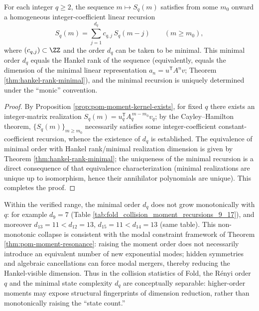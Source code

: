 \begin{proposition}\label{prop:pom-moment-minrecurrence-hankel}
For each integer \(q\ge 2\), the sequence \(m\mapsto S_q(m)\) satisfies from some \(m_0\) onward a homogeneous integer-coefficient linear recursion
\[
S_q(m)=\sum_{j=1}^{d_q} c_{q,j}\,S_q(m-j)\qquad(m\ge m_0),
\]
where \((c_{q,j})\subset\ZZ\) and the order \(d_q\) can be taken to be minimal.
This minimal order \(d_q\) equals the Hankel rank of the sequence (equivalently, equals the dimension of the minimal linear representation \(a_n=u^{\mathsf T}A^n v\); Theorem \ref{thm:hankel-rank-minimal}), and the minimal recursion is uniquely determined under the ``monic'' convention.
\end{proposition}
\begin{proof}
By Proposition \ref{prop:pom-moment-kernel-exists}, for fixed \(q\) there exists an integer-matrix realization \(S_q(m)=u_q^{\mathsf T}A_q^{\,m-m_0}v_q\);
by the Cayley--Hamilton theorem, \(\{S_q(m)\}_{m\ge m_0}\) necessarily satisfies some integer-coefficient constant-coefficient recursion, whence the existence of \(d_q\) is established.
The equivalence of minimal order with Hankel rank/minimal realization dimension is given by Theorem \ref{thm:hankel-rank-minimal}; the uniqueness of the minimal recursion is a direct consequence of that equivalence characterization (minimal realizations are unique up to isomorphism, hence their annihilator polynomials are unique). This completes the proof.
\end{proof}

\begin{remark}\label{rem:pom-moment-order-collapse-nonmonotone}
Within the verified range, the minimal order \(d_q\) does not grow monotonically with \(q\): for example \(d_9=7\) (Table \ref{tab:fold_collision_moment_recursions_9_17}), and moreover \(d_{13}=11<d_{12}=13\), \(d_{15}=11<d_{14}=13\) (same table).
This non-monotonic collapse is consistent with the modal constraint framework of Theorem \ref{thm:pom-moment-resonance}: raising the moment order does not necessarily introduce an equivalent number of new exponential modes; hidden symmetries and algebraic cancellations can force modal mergers, thereby reducing the Hankel-visible dimension.
Thus in the collision statistics of Fold, the Rényi order \(q\) and the minimal state complexity \(d_q\) are conceptually separable: higher-order moments may expose structural fingerprints of dimension reduction, rather than monotonically raising the ``state count.''
\end{remark}

